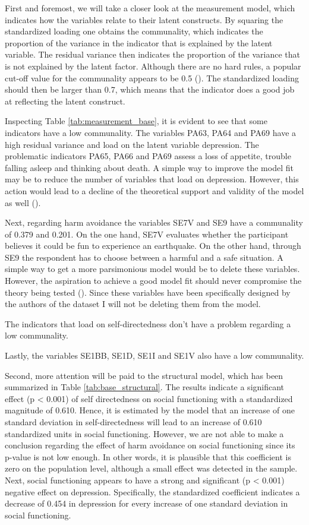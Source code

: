 \documentclass[11pt]{article}
\begin{document}
First and foremost, we will take a closer look at the measurement model, which indicates how the variables relate to their latent constructs.
By squaring the standardized loading one obtains the communality, which indicates the proportion of the variance in the indicator that is explained by the latent variable.
The residual variance then indicates the proportion of the variance that is not explained by the latent factor.
Although there are no hard rules, a popular cut-off value for the communality appears to be 0.5 (\cite{hair2010}).
The standardized loading should then be larger than 0.7, which means that the indicator does a good job at reflecting the latent construct.
 
Inspecting Table \ref{tab:measurement_base}, it is evident to see that some indicators have a low communality.
The variables PA63, PA64 and PA69 have a high residual variance and load on the latent variable depression.
The problematic indicators PA65, PA66 and PA69 assess a loss of appetite, trouble falling asleep and thinking about death.
A simple way to improve the model fit may be to reduce the number of variables that load on depression.
However, this action would lead to a decline of the theoretical support and validity of the model as well (\cite{hair2010}).

Next, regarding harm avoidance the variables SE7V and SE9 have a communality of 0.379 and 0.201.
On the one hand, SE7V evaluates whether the participant believes it could be fun to experience an earthquake.
On the other hand, through SE9 the respondent has to choose between a harmful and a safe situation. 
A simple way to get a more parsimonious model would be to delete these variables.
However, the aspiration to achieve a good model fit should never compromise the theory being tested (\cite{hair2010}).
Since these variables have been specifically designed by the authors of the dataset I will not be deleting them from the model.

The indicators that load on self-directedness don't have a problem regarding a low communality.

Lastly, the variables SE1BB, SE1D, SE1I and SE1V also have a low communality.

Second, more attention will be paid to the structural model, which has been summarized in Table \ref{tab:base_structural}.
The results indicate a significant effect (p < 0.001) of self directedness on social functioning with a standardized magnitude of 0.610.
Hence, it is estimated by the model that an increase of one standard deviation in self-directedness will lead to an increase of 0.610 standardized units in social functioning.
However, we are not able to make a conclusion regarding the effect of harm avoidance on social functioning since its p-value is not low enough.
In other words, it is plausible that this coefficient is zero on the population level, although a small effect was detected in the sample.
Next, social functioning appears to have a strong and significant (p < 0.001) negative effect on depression.
Specifically, the standardized coefficient indicates a decrease of 0.454 in depression for every increase of one standard deviation in social functioning. 
\end{document}
